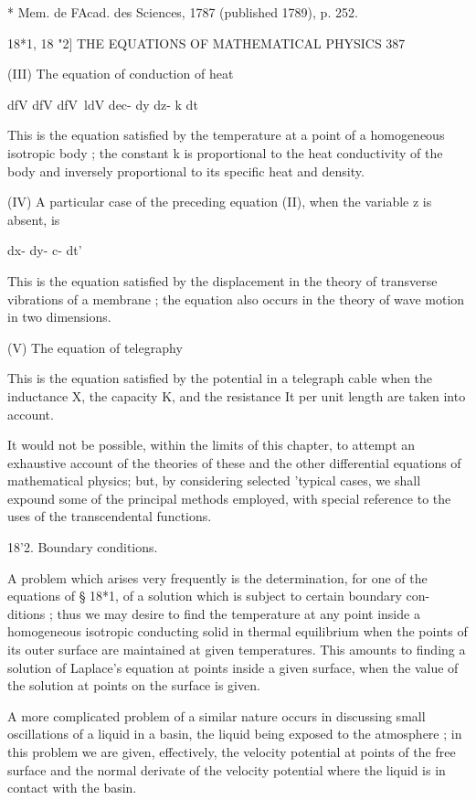 * Mem. de FAcad. des Sciences, 1787 (published 1789), p. 252. 



18*1, 18 "2] THE EQUATIONS OF MATHEMATICAL PHYSICS 387 

(III) The equation of conduction of heat 

dfV dfV dfV\ ldV 
dec- dy  dz- k dt 

This is the equation satisfied by the temperature at a point of a homogeneous isotropic 
body ; the constant k is proportional to the heat conductivity of the body and inversely 
proportional to its specific heat and density. 

(IV) A particular case of the preceding equation (II), when the variable 
z is absent, is 

dx- dy- c- dt'  

This is the equation satisfied by the displacement in the theory of transverse vibrations 
of a membrane ; the equation also occurs in the theory of wave motion in two dimensions. 

(V) The equation of telegraphy 

This is the equation satisfied by the potential in a telegraph cable when the inductance 
X, the capacity K, and the resistance It per unit length are taken into account. 

It would not be possible, within the limits of this chapter, to attempt 
an exhaustive account of the theories of these and the other differential 
equations of mathematical physics; but, by considering selected 'typical 
cases, we shall expound some of the principal methods employed, with 
special reference to the uses of the transcendental functions. 

18'2. Boundary conditions. 

A problem which arises very frequently is the determination, for one of the 
 equations of § 18*1, of a solution which is subject to certain boundary con- 
ditions ; thus we may desire to find the temperature at any point inside a 
homogeneous isotropic conducting solid in thermal equilibrium when the 
points of its outer surface are maintained at given temperatures. This 
amounts to finding a solution of Laplace's equation at points inside a given 
surface, when the value of the solution at points on the surface is given. 

A more complicated problem of a similar nature occurs in discussing 
small oscillations of a liquid in a basin, the liquid being exposed to the 
atmosphere ; in this problem we are given, effectively, the velocity potential 
at points of the free surface and the normal derivate of the velocity potential 
where the liquid is in contact with the basin. 

